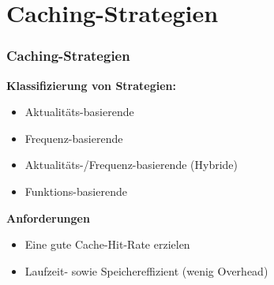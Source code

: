 \documentclass[presentation]{beamer}
\begin{document}

\section{Caching-Strategien}

\begin{frame}
\frametitle{Caching-Strategien}
\color{dd-gray} \textbf{Klassifizierung von Strategien:} \color{black} 
\vspace{0.1cm}
\begin{itemize}
	\item Aktualitäts-basierende
	\item Frequenz-basierende
	\item Aktualitäts-/Frequenz-basierende (Hybride)
	\item Funktions-basierende
\end{itemize}
	\vspace{0.3cm}
	\color{dd-gray} \textbf{Anforderungen} \color{black} 
	\begin{itemize}
	\item Eine gute Cache-Hit-Rate erzielen
	\item Laufzeit- sowie Speichereffizient (wenig Overhead) 
	\end{itemize}
\end{frame}
\end{document}
